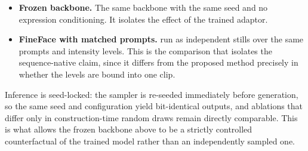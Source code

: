 \begin{itemize}
    \item \textbf{Frozen backbone.} The same backbone with the same seed and no expression
    conditioning. It isolates the effect of the trained adaptor.
    \item \textbf{FineFace with matched prompts.} \citet{varanka2024fineface} run as
    independent stills over the same prompts and intensity levels. This is the comparison
    that isolates the sequence-native claim, since it differs from the proposed method
    precisely in whether the levels are bound into one clip.
\end{itemize}
Inference is seed-locked: the sampler is re-seeded immediately before generation, so the
same seed and configuration yield bit-identical outputs, and ablations that differ only in
construction-time random draws remain directly comparable. This is what allows the frozen
backbone above to be a strictly controlled counterfactual of the trained model rather than
an independently sampled one.
